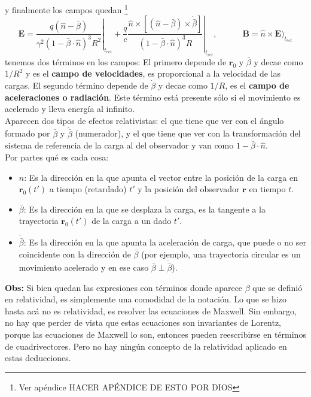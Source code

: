 y finalmente los campos quedan \footnote{Ver apéndice HACER APÉNDICE DE ESTO POR DIOS}
\begin{equation*}
    \textbf{E} = 
    \left.
        \frac
        {
            q(\hat{n}-\bar{\beta})
        }
        {
            \gamma^{2}(1 - \bar{\beta}\cdot \hat{n})^{3}R^{2}
        }
    \right|_{t_{ret}}
    +
    \frac{q}{c}
    \left.
        \frac
        {
            \hat{n}\times
            \left[
                (\hat{n} - \bar{\beta})\times \dot{\bar{\beta}}
            \right]
        }
        {
            (1 - \bar{\beta}\cdot \hat{n})^{3}R
        }
    \right|_{t_{ret}},
    \quad
    \quad
    \quad
    \textbf{B} = \hat{n}\times \textbf{E}\big)_{t_{ret}}
\end{equation*}
tenemos dos términos en los campos: El primero depende de $\textbf{r}_{0}$ y $\bar{\beta}$ y decae como $1/R^{2}$ y es el \textbf{campo de velocidades}, es proporcional a la velocidad de las cargas. El segundo término depende de $\dot{\beta}$ y decae como $1/R$, es el \textbf{campo de aceleraciones o radiación}. Este término está presente sólo si el movimiento es acelerado y lleva energía al infinito.\\
\indent Aparecen dos tipos de efectos relativistas: el que tiene que ver con el ángulo formado por $\bar{\beta}$ y $\dot{\bar{\beta}}$ (numerador), y el que tiene que ver con la transformación del sistema de referencia de la carga al del observador y van como $1 - \bar{\beta} \cdot \hat{n}$.\\
\indent Por partes qué es cada cosa:
\begin{itemize}
    \item $\hat{n}$: Es la dirección en la que apunta el vector entre la posición de la carga en $\textbf{r}_{0}(t')$ a tiempo (retardado) $t'$ y la posición del observador $\textbf{r}$ en tiempo $t$.
    \item $\bar{\beta}$: Es la dirección en la que se desplaza la carga, es la tangente a la trayectoria $\textbf{r}_{0}(t')$ de la carga a un dado $t'$.
    \item $\dot{\bar{\beta}}$: Es la dirección en la que apunta la aceleración de carga, que puede o no ser coincidente con la dirección de $\bar{\beta}$ (por ejemplo, una trayectoria circular es un movimiento acelerado y en ese caso $\bar{\beta} \perp \dot{\bar{\beta}}$).
\end{itemize}
\indent \textbf{Obs:} Si bien quedan las expresiones con términos donde aparece $\beta$ que se definió en relatividad, es simplemente una comodidad de la notación. Lo que se hizo hasta acá no es relatividad, es resolver las ecuaciones de Maxwell. Sin embargo, no hay que perder de vista que estas ecuaciones son invariantes de Lorentz, porque las ecuaciones de Maxwell lo son, entonces pueden reescribirse en términos de cuadrivectores. Pero no hay ningún concepto de la relatividad aplicado en estas deducciones.\\
